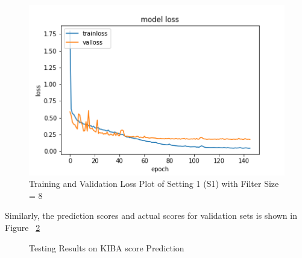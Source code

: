 \begin{figure}
    \centering
    \includegraphics[width=.8\textwidth]{mainmatter/4-Results/images/S1_loss.png}
    \caption[Training Loss Plot]{Training and Validation Loss Plot of Setting 1 (S1) with Filter Size = 8}
    \label{fig:train_val_loss_plot}
\end{figure}

Similarly, the prediction scores and actual scores for validation sets is shown in Figure ~\ref{fig:val_train}
\begin{figure}[H]
    \caption{Testing Results on KIBA score Prediction}
    \label{fig:val_train}
\end{figure}




